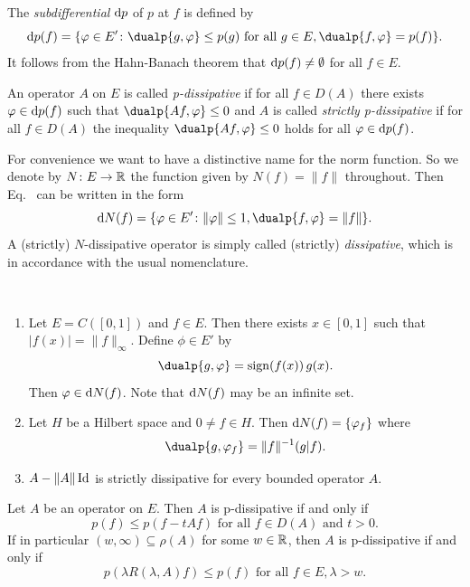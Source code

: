 The \emph{subdifferential} $\mathop{}\!\mathrm{d}{p}$ of\/ $p$ at $f$ is defined by
\begin{equation}\label{eq:a2-2.5}
\ddp(f) = \{\phi \in E' \colon \dualp{g,\phi} \leq p(g) \text{ for all } g \in E, \dualp{f,\phi} = p(f) \}.
\end{equation}
It follows from the Hahn-Banach theorem that $\mathop{}\!\mathrm{d}{p}(f) \neq \emptyset$ for all $f \in E$.
\begin{definition}\label{def:a2-2.1}
An operator $A$ on $E$ is called \emph{p-dissipative} if for all $f \in D(A)$ there exists $\phi \in \ddp(f)$ such that $\dualp{Af,\phi} \leq 0$ 
and $A$ is called \emph{strictly p-dissipative} if for all $f \in D(A)$ the inequality $\dualp{Af,\phi} \leq 0$ holds for all $\phi \in \ddp(f)$.
\end{definition}
For convenience we want to have a distinctive name for the norm function.
So we denote by $N \colon E \to \mathbb{R}$ the function given by $N(f) = \|f\|$ throughout.
Then Eq.~ can be written in the form
\begin{equation}\label{eq:a2-2.6}
\dN(f) = \{\phi \in E' \colon \|\phi\|\leq 1, \dualp{f,\phi} = \|f\|\}.
\end{equation}
A (strictly) $N$-dissipative operator is simply called (strictly) \emph{dissipative}, which is in accordance with the usual nomenclature.
\begin{examples}\label{ex:a2-2.2}  ~ 
\begin{enumerate}[\upshape(i), wide, labelindent=.25em]

\item \label{ex:a2-2.2.1}
Let $E = C([0,1])$ and $f \in E$.
Then there exists $x \in [0,1]$ such that $|f(x)| = \|f\|_{\infty}$.
Define $\phi \in E'$ by 
%
\[
	\dualp{g,\phi} = \sign(f(x))\,g(x) .
\]
%
Then $\phi \in \dN(f)$.
Note that $\mathop{}\!\mathrm{d}{N}(f)$ may be an infinite set.
\item \label{ex:a2-2.2.2}
Let $H$ be a Hilbert space and $ 0 \neq f \in H$. %
Then  $\dN(f) = \{\phi_{f}\}$ where 
%
\[
    \dualp{g,\phi_{f}} = \|f\|^{-1}(g \vert f) .
\]
%
\item \label{ex:a2-2.2.3}
$A - \|A\|\operatorname{Id}$ is strictly dissipative for every bounded operator $A$.
\end{enumerate}
\end{examples}
\begin{proposition}\label{prop:a2-2.3}
Let $A$ be an operator on $E$.
Then $A$ is p-dissipative if and only if
\begin{equation} \label{eq:a2-2.7}
p(f) \leq p(f - tAf) \text{ for all } f \in D(A) \text{ and } t > 0.
\end{equation}
If in particular $(w,\infty) \subseteq \rho(A)$ for some $w \in \mathbb{R}$, then $A$ is p-dissipative if and only if
\begin{equation}\label{eq:a2-2.8}
p(\lambda R(\lambda,A)f) \leq p(f) \text{ for all } f \in E, \lambda > w.
\end{equation}
\end{proposition}

